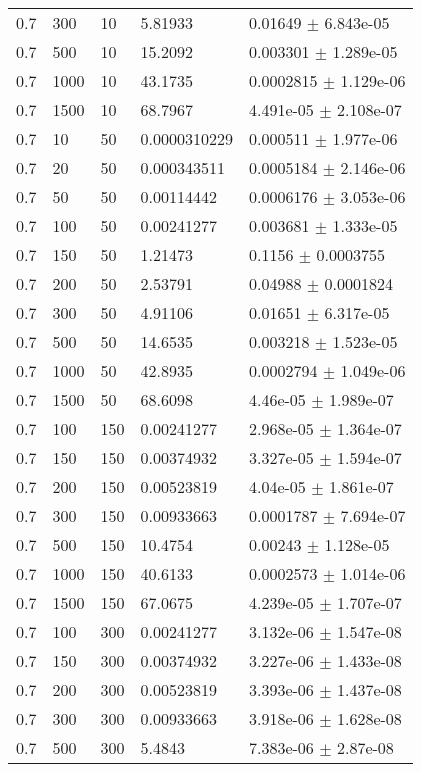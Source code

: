 \begin{longtable}{lllll}
 0.7 &   300 &    10 &  5.81933 &  0.01649 $\pm$ 6.843e-05 \\
 0.7 &   500 &    10 &  15.2092 & 0.003301 $\pm$ 1.289e-05 \\
 0.7 &  1000 &    10 &  43.1735 & 0.0002815 $\pm$ 1.129e-06 \\
 0.7 &  1500 &    10 &  68.7967 & 4.491e-05 $\pm$ 2.108e-07 \\
 0.7 &    10 &    50 & 0.0000310229 & 0.000511 $\pm$ 1.977e-06 \\
 0.7 &    20 &    50 & 0.000343511 & 0.0005184 $\pm$ 2.146e-06 \\
 0.7 &    50 &    50 & 0.00114442 & 0.0006176 $\pm$ 3.053e-06 \\
 0.7 &   100 &    50 & 0.00241277 & 0.003681 $\pm$ 1.333e-05 \\
 0.7 &   150 &    50 &  1.21473 &   0.1156 $\pm$ 0.0003755 \\
 0.7 &   200 &    50 &  2.53791 &  0.04988 $\pm$ 0.0001824 \\
 0.7 &   300 &    50 &  4.91106 &  0.01651 $\pm$ 6.317e-05 \\
 0.7 &   500 &    50 &  14.6535 & 0.003218 $\pm$ 1.523e-05 \\
 0.7 &  1000 &    50 &  42.8935 & 0.0002794 $\pm$ 1.049e-06 \\
 0.7 &  1500 &    50 &  68.6098 & 4.46e-05 $\pm$ 1.989e-07 \\
 0.7 &   100 &   150 & 0.00241277 & 2.968e-05 $\pm$ 1.364e-07 \\
 0.7 &   150 &   150 & 0.00374932 & 3.327e-05 $\pm$ 1.594e-07 \\
 0.7 &   200 &   150 & 0.00523819 & 4.04e-05 $\pm$ 1.861e-07 \\
 0.7 &   300 &   150 & 0.00933663 & 0.0001787 $\pm$ 7.694e-07 \\
 0.7 &   500 &   150 &  10.4754 &  0.00243 $\pm$ 1.128e-05 \\
 0.7 &  1000 &   150 &  40.6133 & 0.0002573 $\pm$ 1.014e-06 \\
 0.7 &  1500 &   150 &  67.0675 & 4.239e-05 $\pm$ 1.707e-07 \\
 0.7 &   100 &   300 & 0.00241277 & 3.132e-06 $\pm$ 1.547e-08 \\
 0.7 &   150 &   300 & 0.00374932 & 3.227e-06 $\pm$ 1.433e-08 \\
 0.7 &   200 &   300 & 0.00523819 & 3.393e-06 $\pm$ 1.437e-08 \\
 0.7 &   300 &   300 & 0.00933663 & 3.918e-06 $\pm$ 1.628e-08 \\
 0.7 &   500 &   300 &   5.4843 & 7.383e-06 $\pm$ 2.87e-08 \\

\end{longtable}
